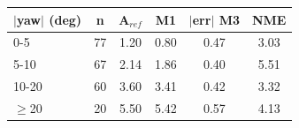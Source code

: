 \begin{tabular}{@{}lccccc@{}}
\toprule
$|$yaw$|$ (deg) & n & A$_{ref}$ & M1 & $|$err$|$ M3 & NME\\
\midrule
0-5 & 77 & 1.20 & 0.80 & 0.47 & 3.03\\
5-10 & 67 & 2.14 & 1.86 & 0.40 & 5.51\\
10-20 & 60 & 3.60 & 3.41 & 0.42 & 3.32\\
$\geq$20 & 20 & 5.50 & 5.42 & 0.57 & 4.13\\
\bottomrule
\end{tabular}
